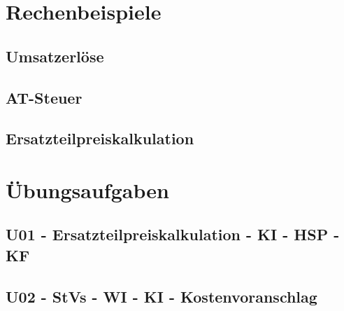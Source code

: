 
\chapter{Rechenbeispiele}%

\section{Umsatzerlöse}\label{sec:01-Umsatzerloese}


\section{AT-Steuer}\label{sec:02-AT-Steuer}


\section{Ersatzteilpreiskalkulation}\label{sec:03-Ersatzteilpreiskalkulation}





\chapter{Übungsaufgaben}

\section{U01 - Ersatzteilpreiskalkulation - KI - HSP - KF}\label{sec:U01-Ersatzteilpreiskalkulation-KI-HSP-KF}



\section{U02 - StVs - WI - KI - Kostenvoranschlag}\label{sec:U02-StVs-WI-KI-Kostenvoranschlag}



